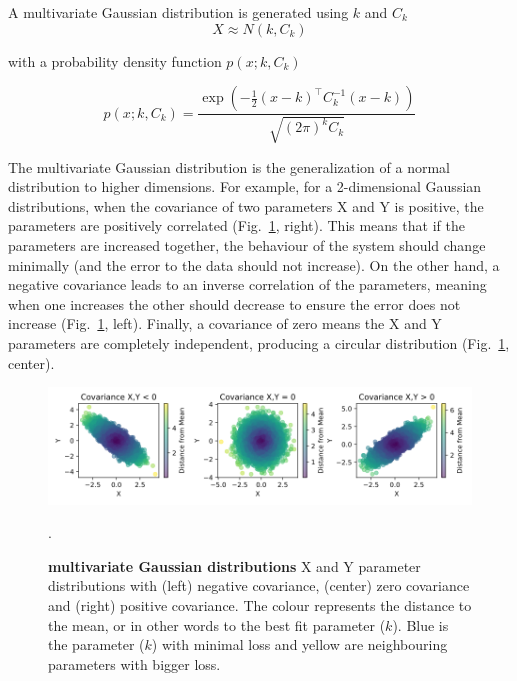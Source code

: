 A multivariate Gaussian distribution is generated using $k$ and $C_{k}$
\begin{equation}
    X \approx N(k,C_k)
\end{equation}

with a probability density function $p(x;k,C_k )$

\begin{equation}
    p(x;k,C_k )= \frac{\exp\left(-\frac{1}{2} (x - k)^\top C_k^{-1} (x - k)\right)}{\sqrt{(2\pi)^k C_k}}
\end{equation}

The multivariate Gaussian distribution is the generalization of a normal distribution to higher dimensions.
For example, for a 2-dimensional Gaussian distributions, when the covariance of two parameters X and Y is positive, the parameters are positively correlated (Fig.~\ref{fig:multivariate_gaussians}, right).
This means that if the parameters are increased together, the behaviour of the system should change minimally (and the error to the data should not increase).
On the other hand, a negative covariance leads to an inverse correlation of the parameters, meaning when one increases the other should decrease to ensure the error does not increase (Fig.~\ref{fig:multivariate_gaussians}, left). Finally, a covariance of zero means the X and Y parameters are completely independent, producing a circular distribution (Fig.~\ref{fig:multivariate_gaussians}, center).

\begin{figure}[H] %
    \centering
    \begin{adjustbox}{center}
        \includegraphics[width=1\textwidth]{chapters/Chapter 2/multivariate_gaussians} %
    \end{adjustbox}
    \caption{\textbf{multivariate Gaussian distributions} X and Y parameter distributions with (left) negative covariance, (center) zero covariance and (right) positive covariance. The colour represents the distance to the mean, or in other words to the best fit parameter ($k$). Blue is the parameter ($k$) with minimal loss and yellow are neighbouring parameters with bigger loss. }.
    \label{fig:multivariate_gaussians} %
\end{figure}

